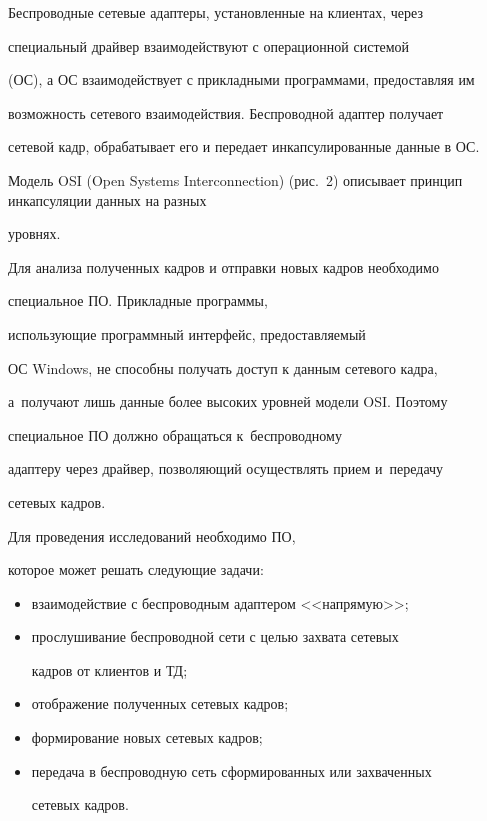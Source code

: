   Беспроводные сетевые адаптеры, установленные на клиентах, через


специальный драйвер взаимодействуют с операционной системой


(ОС), а ОС взаимодействует с прикладными программами, предоставляя им


возможность сетевого взаимодействия. Беспроводной адаптер получает


сетевой кадр, обрабатывает его и передает инкапсулированные данные в ОС.


Модель OSI (Open Systems Interconnection) (рис.~2) описывает принцип инкапсуляции данных на разных


уровнях.








  Для анализа полученных кадров и отправки новых кадров необходимо


специальное ПО. Прикладные программы,


использующие программный интерфейс, предоставляемый


ОС Windows, не способны получать доступ к данным сетевого кадра,


а~получают лишь данные более высоких уровней модели OSI. Поэтому


специальное ПО должно обращаться к~беспроводному


адаптеру через драйвер, позволяющий осуществлять прием и~передачу


сетевых кадров.





  Для проведения исследований необходимо ПО,


которое может решать следующие задачи:


  \begin{itemize}


\item взаимодействие с беспроводным адаптером <<напрямую>>;\\[-14pt]


\item прослушивание беспроводной сети с целью захвата сетевых


кадров от клиентов и ТД;\\[-14pt]


\item отображение полученных сетевых кадров;\\[-14pt]


\item формирование новых сетевых кадров;\\[-14pt]


\item передача в беспроводную сеть сформированных или захваченных


сетевых кадров.


\end{itemize}








